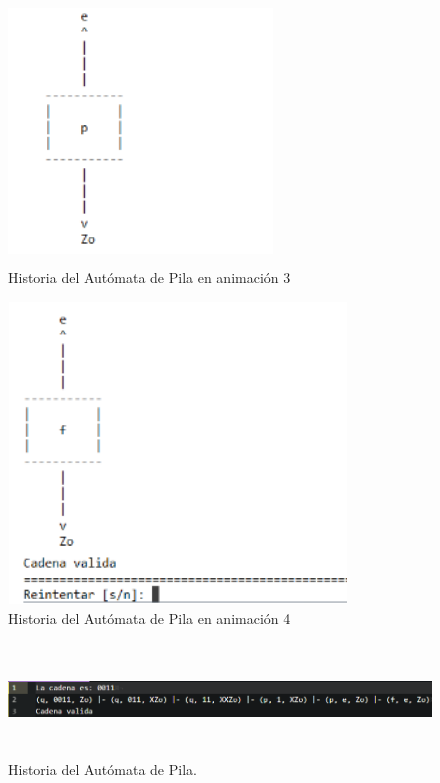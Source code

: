 	\begin{figure}[H]
		\begin{center}
			\includegraphics[width=7cm, height=7cm]{img/pila-manual-consola3.png}
			\caption{Historia del Autómata de Pila en animación 3}
			\label{fig:pila1c}
		\end{center}
	\end{figure}
	\begin{figure}[H]
		\begin{center}
			\includegraphics[width=9cm, height=8cm]{img/pila-manual-consola4.png}
			\caption{Historia del Autómata de Pila en animación 4}
			\label{fig:pila1d}
		\end{center}
	\end{figure}
	\begin{figure}[H]
		\begin{center}
			\includegraphics[width=\linewidth, height=3cm]{img/pila-manual-archivo.png}
			\caption{Historia del Autómata de Pila.}
			\label{fig:pila2}
		\end{center}
	\end{figure}
